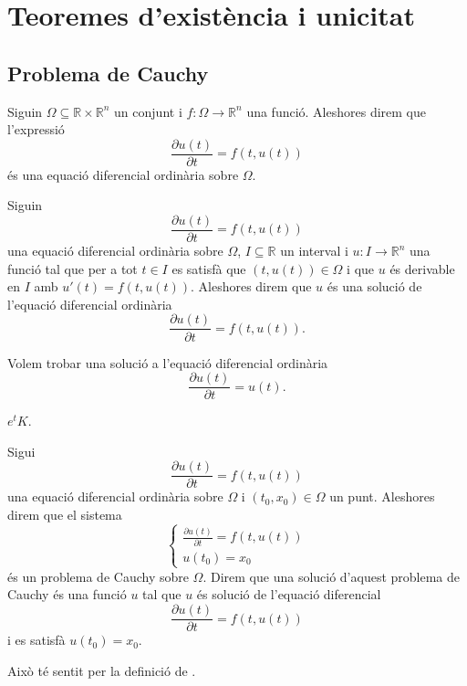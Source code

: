\documentclass[../Apunts.tex]{subfiles}
\begin{document}
	\section{Teoremes d'existència i unicitat}
	\subsection{Problema de Cauchy}
	\begin{definition}
		\label{def:equació diferencial ordinària}
		Siguin \(\Omega\subseteq\mathbb{R}\times\mathbb{R}^{n}\) un conjunt i \(f\colon\Omega\longrightarrow\mathbb{R}^{n}\) una funció. Aleshores direm que l'expressió
		\[\frac{\partial u(t)}{\partial t}=f(t,u(t))\]
		és una equació diferencial ordinària sobre \(\Omega\).
	\end{definition}
	\begin{definition}
		\label{def:solució d'una equació diferencial ordinària}
		Siguin
		\[\frac{\partial u(t)}{\partial t}=f(t,u(t))\]
		una equació diferencial ordinària sobre \(\Omega\), \(I\subseteq\mathbb{R}\) un interval i \(u\colon I\longrightarrow\mathbb{R}^{n}\) una funció tal que per a tot \(t\in I\) es satisfà que \((t,u(t))\in\Omega\) i que \(u\) és derivable en \(I\) amb \(u'(t)=f(t,u(t))\). Aleshores direm que \(u\) és una solució de l'equació diferencial ordinària
		\[\frac{\partial u(t)}{\partial t}=f(t,u(t)).\]
	\end{definition}
	\begin{example}	
		\label{ex:exemple d'una equació diferencial 1}
		\label{ex:exemple edos de la exponencial}
		Volem trobar una solució a l'equació diferencial ordinària
		\[\frac{\partial u(t)}{\partial t}=u(t).\]
		\begin{solution}
			\(e^{t}K\).
		\end{solution}
	\end{example}
	\begin{definition}
		\label{def:problema de Cauchy}
		\label{def:solució d'un problema de Cauchy}
		Sigui
		\[\frac{\partial u(t)}{\partial t}=f(t,u(t))\]
		una equació diferencial ordinària sobre \(\Omega\) i \((t_{0},x_{0})\in\Omega\) un punt. Aleshores direm que el sistema
		\[\begin{cases*}
			\displaystyle \frac{\partial u(t)}{\partial t}=f(t,u(t)) \\
			\displaystyle u(t_{0})=x_{0}
		\end{cases*}\]
		és un problema de Cauchy sobre \(\Omega\). Direm que una solució d'aquest problema de Cauchy és una funció \(u\) tal que \(u\) és solució de l'equació diferencial
		\[\frac{\partial u(t)}{\partial t}=f(t,u(t))\]
		i es satisfà \(u(t_{0})=x_{0}\).
		
		Això té sentit per la definició de .
	\end{definition}
\end{document}
